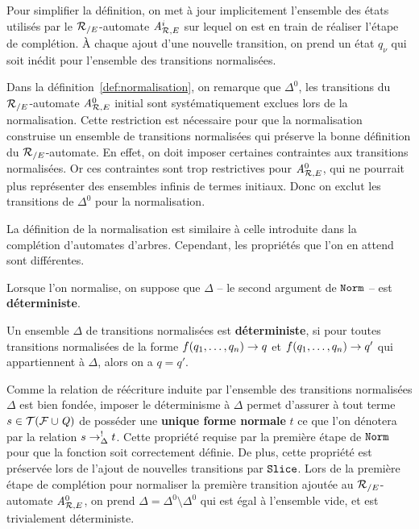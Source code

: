 \noindent
Pour simplifier la définition, on met à jour implicitement l'ensemble
des états utilisés par le ${\mathcal R_{/E}}$-automate ${\mathit A}_{\mathcal R,E}^i$ sur lequel on est
en train de réaliser l'étape de complétion. À chaque ajout d'une
nouvelle transition, on prend un état $q_\nu$ qui soit inédit pour
l'ensemble des transitions normalisées.


\noindent
Dans la définition~\ref{def:normalisation}, on remarque que $\Delta^0$, les transitions du ${\mathcal R_{/E}}$-automate 
${\mathit A}_{\mathcal R,E}^0$ initial sont systématiquement exclues lors de la normalisation.
Cette restriction est nécessaire pour que la normalisation construise un ensemble de transitions normalisées
qui préserve la bonne définition du ${\mathcal R_{/E}}$-automate.
En effet, on doit imposer certaines contraintes aux transitions normalisées. Or ces contraintes
sont trop restrictives pour ${\mathit A}_{\mathcal R,E}^0$, qui ne pourrait plus représenter des ensembles infinis de termes initiaux.
Donc on exclut les transitions de $\Delta^0$ pour la normalisation.

La définition de la normalisation est similaire à celle introduite dans la complétion d'automates d'arbres.
Cependant, les propriétés que l'on en attend sont différentes.

Lorsque l'on normalise, on suppose que $\Delta$ -- le second argument de $\mathtt{Norm}$ -- est \textbf{déterministe}.

\begin{definition}
Un ensemble $\Delta$ de transitions normalisées est \textbf{déterministe}, si pour 
toutes transitions normalisées de la forme $f(q_1, \dots, q_n) \rightarrow q$ et
$f(q_1, \dots, q_n) \rightarrow q'$ qui appartiennent à $\Delta$, alors on a $q = q'$.
\end{definition}

Comme la relation de réécriture induite par l'ensemble des transitions normalisées $\Delta$ est bien fondée,
imposer le déterminisme à $\Delta$ permet d'assurer à tout terme $s
\in \mathcal{ T(F \cup \mathit Q)}$ de posséder une \textbf{unique forme normale} $t$ ce que l'on dénotera
par la relation $s \rightarrow_\Delta^! t$. Cette propriété requise par la
première étape de $\mathtt{Norm}$ pour que la fonction soit correctement définie.
De plus, cette propriété est préservée lors de l'ajout de nouvelles transitions par $\mathtt{Slice}$.
Lors de la première étape de complétion pour normaliser la première transition ajoutée
au ${\mathcal R_{/E}}$-automate ${\mathit A}_{\mathcal R,E}^0$, on prend $\Delta = \Delta^0 \setminus \Delta^0$ qui est
égal à l'ensemble vide, et est trivialement déterministe.

